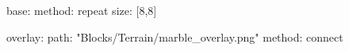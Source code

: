 base:
  method: repeat
  size: [8,8]

overlay:
  path: "Blocks/Terrain/marble_overlay.png"
  method: connect